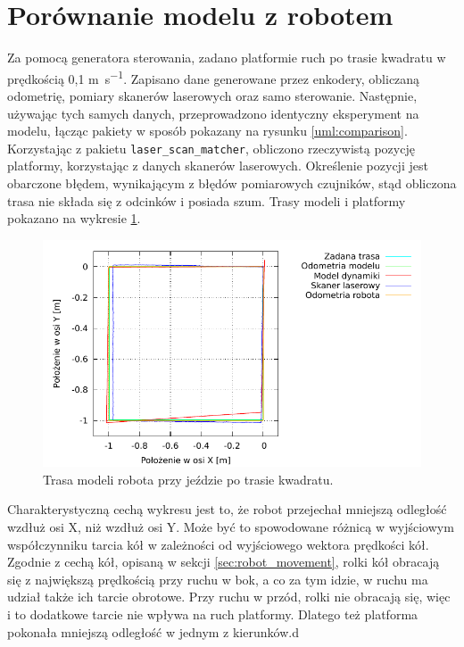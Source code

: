 \section{Porównanie modelu z robotem}
	Za pomocą generatora sterowania, zadano platformie ruch po trasie kwadratu w prędkością 0,1 \si{\metre\per\second}.
	Zapisano dane generowane przez enkodery, obliczaną odometrię, pomiary skanerów laserowych oraz samo sterowanie.
	Następnie, używając tych samych danych, przeprowadzono identyczny eksperyment na modelu, łącząc pakiety w sposób pokazany na rysunku \ref{uml:comparison}.
	Korzystając z pakietu \texttt{laser\_scan\_matcher}, obliczono rzeczywistą pozycję platformy, korzystając z danych skanerów laserowych.
	Określenie pozycji jest obarczone błędem, wynikającym
	z błędów pomiarowych czujników, stąd obliczona trasa nie składa się z odcinków i posiada szum.
	Trasy modeli i platformy pokazano na wykresie \ref{plot:velmobil_xy}.
	
	\begin{figure}[h]
		\centering
		\includegraphics[width=\textwidth]{plots/velmobil_xy.pdf}
			\caption{Trasa modeli robota przy jeździe po trasie kwadratu.}
		\label{plot:velmobil_xy}
	\end{figure}
	
	Charakterystyczną cechą wykresu jest to, że robot przejechał mniejszą odległość wzdłuż osi X, niż wzdłuż osi Y.
	Może być to spowodowane różnicą w wyjściowym współczynniku tarcia kół w zależności od wyjściowego wektora prędkości kół.
	Zgodnie z cechą kół, opisaną w sekcji \ref{sec:robot_movement}, rolki kół obracają się z największą prędkością przy ruchu w bok, a co za tym idzie, w ruchu ma udział także
	ich tarcie obrotowe. Przy ruchu w przód, rolki nie obracają się, więc i to dodatkowe tarcie nie wpływa na ruch platformy.
	Dlatego też platforma pokonała mniejszą odległość w jednym z kierunków.d
	
